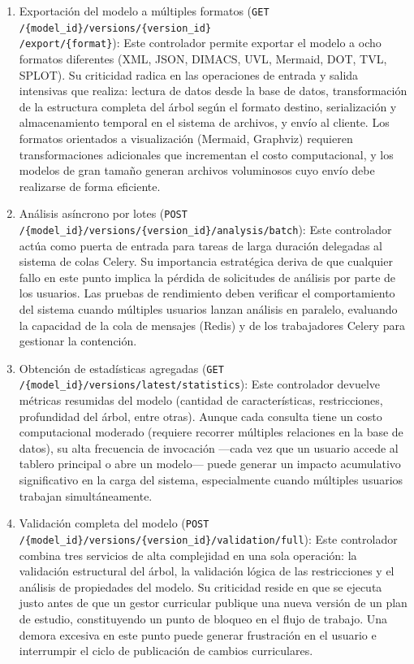 \begin{enumerate}
    \item Exportación del modelo a múltiples formatos (\texttt{GET /\{model\_id\}/versions/\{version\_id\} \\ /export/\{format\}}): 
    Este controlador permite exportar el modelo a ocho formatos diferentes (XML, JSON, DIMACS, \ac{UVL}, Mermaid, 
    DOT, TVL, SPLOT). Su criticidad radica en las operaciones de entrada y salida intensivas que realiza: 
    lectura de datos desde la base de datos, transformación de la estructura completa del árbol según el formato 
    destino, serialización y almacenamiento temporal en el sistema de archivos, y envío al cliente. Los formatos 
    orientados a visualización (Mermaid, Graphviz) requieren transformaciones adicionales que incrementan el 
    costo computacional, y los modelos de gran tamaño generan archivos voluminosos cuyo envío debe realizarse 
    de forma eficiente.
    
    \item Análisis asíncrono por lotes (\texttt{POST /\{model\_id\}/versions/\{version\_id\}/analysis/batch}): 
    Este controlador actúa como puerta de entrada para tareas de larga duración delegadas al sistema de colas 
    Celery. Su importancia estratégica deriva de que cualquier fallo en este punto implica la pérdida de 
    solicitudes de análisis por parte de los usuarios. Las pruebas de rendimiento deben verificar el 
    comportamiento del sistema cuando múltiples usuarios lanzan análisis en paralelo, evaluando la capacidad 
    de la cola de mensajes (Redis) y de los trabajadores Celery para gestionar la contención.
    
    \item Obtención de estadísticas agregadas (\texttt{GET /\{model\_id\}/versions/latest/statistics}): 
    Este controlador devuelve métricas resumidas del modelo (cantidad de características, restricciones, profundidad 
    del árbol, entre otras). Aunque cada consulta tiene un costo computacional moderado (requiere recorrer 
    múltiples relaciones en la base de datos), su alta frecuencia de invocación —cada vez que un usuario 
    accede al tablero principal o abre un modelo— puede generar un impacto acumulativo significativo en la 
    carga del sistema, especialmente cuando múltiples usuarios trabajan simultáneamente.
    
    \item Validación completa del modelo (\texttt{POST /\{model\_id\}/versions/\{version\_id\}/validation/full}): 
    Este controlador combina tres servicios de alta complejidad en una sola operación: la validación estructural 
    del árbol, la validación lógica de las restricciones y el análisis de propiedades del modelo. Su criticidad 
    reside en que se ejecuta justo antes de que un gestor curricular publique una nueva versión de un plan de 
    estudio, constituyendo un punto de bloqueo en el flujo de trabajo. Una demora excesiva en este punto puede 
    generar frustración en el usuario e interrumpir el ciclo de publicación de cambios curriculares.
    

\end{enumerate}
